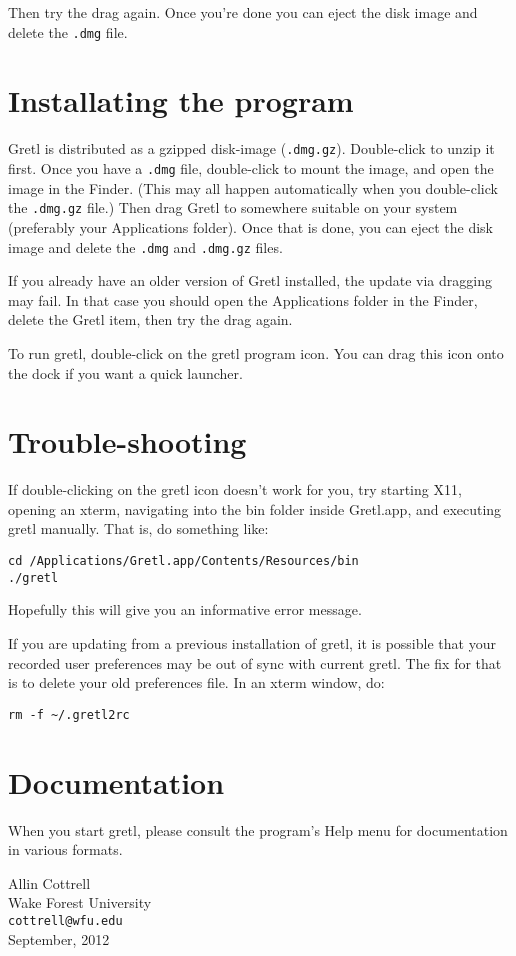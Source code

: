 \documentclass[11pt]{article}
\begin{document}
Then try the drag again. Once you're done you can eject the
disk image and delete the \texttt{.dmg} file.

\section{Installating the program}
\label{sec:install}

\textsf{Gretl} is distributed as a gzipped disk-image
(\texttt{.dmg.gz}).  Double-click to unzip it first.  Once you have a
\texttt{.dmg} file, double-click to mount the image, and open the
image in the Finder. (This may all happen automatically when you
double-click the \texttt{.dmg.gz} file.) Then drag \textsf{Gretl} to
somewhere suitable on your system (preferably your
\textsf{Applications} folder).  Once that is done, you can eject the
disk image and delete the \texttt{.dmg} and \texttt{.dmg.gz} files.

If you already have an older version of \textsf{Gretl} installed, the
update via dragging may fail. In that case you should open the
\textsf{Applications} folder in the Finder, delete the \textsf{Gretl}
item, then try the drag again.

To run gretl, double-click on the gretl program icon.  You can drag
this icon onto the dock if you want a quick launcher.

\section{Trouble-shooting}

If double-clicking on the gretl icon doesn't work for you, try
starting X11, opening an xterm, navigating into the \textsf{bin}
folder inside \textsf{Gretl.app}, and executing 
\textsf{gretl} manually.  That is, do something like:

\begin{verbatim}
cd /Applications/Gretl.app/Contents/Resources/bin
./gretl
\end{verbatim}

Hopefully this will give you an informative error message.

If you are updating from a previous installation of gretl, it
is possible that your recorded user preferences may be out of
sync with current gretl.  The fix for that is to delete
your old preferences file.  In an xterm window, do:

\begin{verbatim}
rm -f ~/.gretl2rc
\end{verbatim}

\section{Documentation}
\label{sec:doc}

When you start gretl, please consult the program's Help menu for
documentation in various formats.

\vspace{.25in}

\raggedright
Allin Cottrell \\
Wake Forest University \\
\texttt{cottrell@wfu.edu} \\
September, 2012
\end{document}
